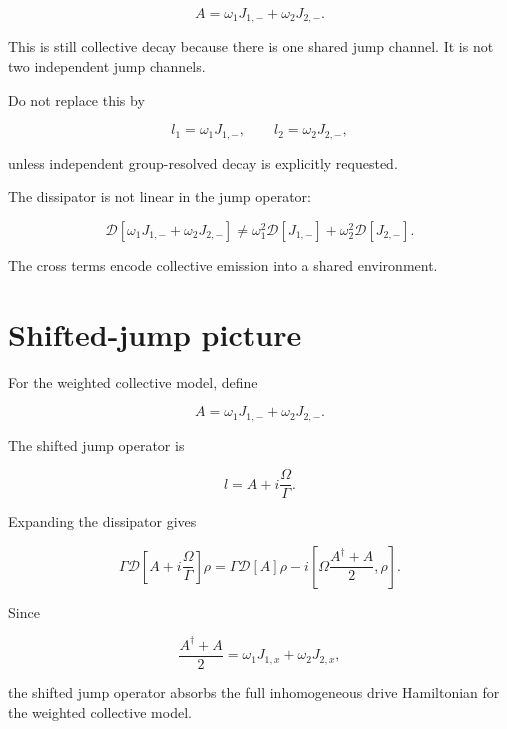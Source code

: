 \documentclass[11pt]{article}
\begin{document}
\begin{equation}
A=\omega_1J_{1,-}+\omega_2J_{2,-}.
\end{equation}

This is still collective decay because there is one shared jump channel. It is
not two independent jump channels.

Do not replace this by

\begin{equation}
l_1=\omega_1J_{1,-},
\qquad
l_2=\omega_2J_{2,-},
\end{equation}

unless independent group-resolved decay is explicitly requested.

The dissipator is not linear in the jump operator:

\begin{equation}
\mathcal{D}[\omega_1J_{1,-}+\omega_2J_{2,-}]
\neq
\omega_1^2\mathcal{D}[J_{1,-}]
+
\omega_2^2\mathcal{D}[J_{2,-}].
\end{equation}

The cross terms encode collective emission into a shared environment.

\section*{Shifted-jump picture}

For the weighted collective model, define

\begin{equation}
A=\omega_1J_{1,-}+\omega_2J_{2,-}.
\end{equation}

The shifted jump operator is

\begin{equation}
l=A+i\frac{\Omega}{\Gamma}.
\end{equation}

Expanding the dissipator gives

\begin{equation}
\Gamma\mathcal{D}\left[A+i\frac{\Omega}{\Gamma}\right]\rho
=
\Gamma\mathcal{D}[A]\rho
-
i\left[\Omega\frac{A^\dagger+A}{2},\rho\right].
\end{equation}

Since

\begin{equation}
\frac{A^\dagger+A}{2}
=
\omega_1J_{1,x}+\omega_2J_{2,x},
\end{equation}

the shifted jump operator absorbs the full inhomogeneous drive Hamiltonian for
the weighted collective model.
\end{document}

